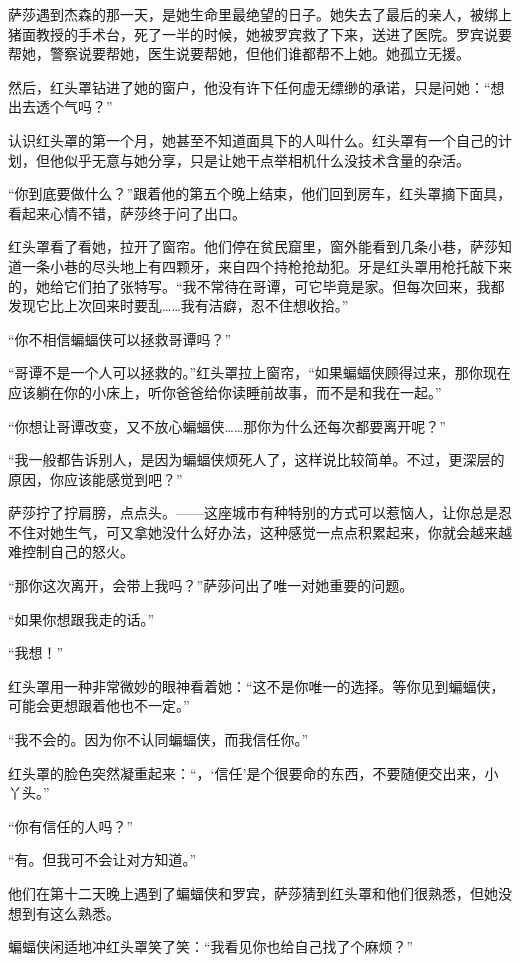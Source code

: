 \documentclass[../main]{subfiles}
\begin{document}
萨莎遇到杰森的那一天，是她生命里最绝望的日子。她失去了最后的亲人，被绑上猪面教授的手术台，死了一半的时候，她被罗宾救了下来，送进了医院。罗宾说要帮她，警察说要帮她，医生说要帮她，但他们谁都帮不上她。她孤立无援。

然后，红头罩钻进了她的窗户，他没有许下任何虚无缥缈的承诺，只是问她：“想出去透个气吗？”

认识红头罩的第一个月，她甚至不知道面具下的人叫什么。红头罩有一个自己的计划，但他似乎无意与她分享，只是让她干点举相机什么没技术含量的杂活。

“你到底要做什么？”跟着他的第五个晚上结束，他们回到房车，红头罩摘下面具，看起来心情不错，萨莎终于问了出口。

红头罩看了看她，拉开了窗帘。他们停在贫民窟里，窗外能看到几条小巷，萨莎知道一条小巷的尽头地上有四颗牙，来自四个持枪抢劫犯。牙是红头罩用枪托敲下来的，她给它们拍了张特写。“我不常待在哥谭，可它毕竟是家。但每次回来，我都发现它比上次回来时要乱……我有洁癖，忍不住想收拾。”

“你不相信蝙蝠侠可以拯救哥谭吗？”

“哥谭不是一个人可以拯救的。”红头罩拉上窗帘，“如果蝙蝠侠顾得过来，那你现在应该躺在你的小床上，听你爸爸给你读睡前故事，而不是和我在一起。”

“你想让哥谭改变，又不放心蝙蝠侠……那你为什么还每次都要离开呢？”

“我一般都告诉别人，是因为蝙蝠侠烦死人了，这样说比较简单。不过，更深层的原因，你应该能感觉到吧？”

萨莎拧了拧肩膀，点点头。——这座城市有种特别的方式可以惹恼人，让你总是忍不住对她生气，可又拿她没什么好办法，这种感觉一点点积累起来，你就会越来越难控制自己的怒火。

“那你这次离开，会带上我吗？”萨莎问出了唯一对她重要的问题。

“如果你想跟我走的话。”

“我想！”

红头罩用一种非常微妙的眼神看着她：“这不是你唯一的选择。等你见到蝙蝠侠，可能会更想跟着他也不一定。”

“我不会的。因为你不认同蝙蝠侠，而我信任你。”

红头罩的脸色突然凝重起来：“，`信任'是个很要命的东西，不要随便交出来，小丫头。”

“你有信任的人吗？”

“有。但我可不会让对方知道。”

他们在第十二天晚上遇到了蝙蝠侠和罗宾，萨莎猜到红头罩和他们很熟悉，但她没想到有这么熟悉。

蝙蝠侠闲适地冲红头罩笑了笑：“我看见你也给自己找了个麻烦？”
\end{document}
